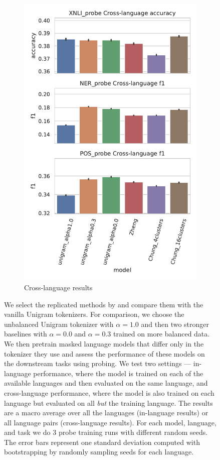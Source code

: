 \begin{figure}
\begin{subfigure}{.5\textwidth}
      \includegraphics[width=\linewidth]{figures/probe_overall_crosslanguage.pdf}
      \caption{Cross-language results}
      \label{fig:probe_overall_crosslanguage}
    \end{subfigure}
    \caption{We select the replicated methods by \citet{chung_improving_2020,zheng_allocating_2021} and compare them with the vanilla Unigram tokenizers. For comparison, we choose the unbalanced Unigram tokenizer with $\alpha=1.0$ and then two stronger baselines with $\alpha=0.0$ and $\alpha=0.3$ trained on more balanced data. We then pretrain masked language models that differ only in the tokenizer they use and assess the performance of these models on the downstream tasks using probing. We test two settings --- in-language performance, where the model is trained on each of the available languages and then evaluated on the same language, and cross-language performance, where the model is also trained on each language but evaluated on all \textit{but} the training language. The results are a macro average over all the languages (in-language results) or all language pairs (cross-language results). For each model, language, and task we do 3 probe training runs with different random seeds. The error bars represent one standard deviation computed with bootstrapping by randomly sampling seeds for each language.}

\end{figure}
